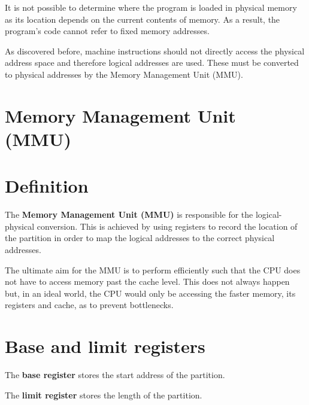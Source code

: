 \documentclass[a4paper]{systems-software}
\begin{document}
It is not possible to determine where the program is loaded in physical memory as its location depends on the current contents of memory. As a result, the program's code cannot refer to fixed memory addresses.

As discovered before, machine instructions should not directly access the physical address space and therefore logical addresses are used. These must be converted to physical addresses by the Memory Management Unit (MMU).


\section{Memory Management Unit (MMU)}

\section*{Definition}

The \textbf{Memory Management Unit (MMU)} is responsible for the logical-physical conversion. This is achieved by using registers to record the location of the partition in order to map the logical addresses to the correct physical addresses.

The ultimate aim for the MMU is to perform efficiently such that the CPU does not have to access memory past the cache level. This does not always happen but, in an ideal world, the CPU would only be accessing the faster memory, its registers and cache, as to prevent bottlenecks.


\newpage

\section*{Base and limit registers}

The \textbf{base register} stores the start address of the partition.

The \textbf{limit register} stores the length of the partition.
\end{document}
